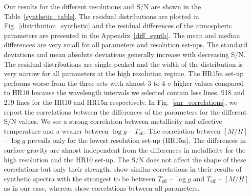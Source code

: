\documentclass[fleqn,usenatbib]{mnras}
\begin{document}
Our results for the different resolutions and S/N are shown in the Table~\ref{synthetic_table}. The residual distributions are plotted in Fig.~\ref{distribution_synthetic} and 
the residual differences of the atmospheric parameters are presented in the Appendix~\ref{diff_synth}. 
The mean and median differences are very small for all parameters and resolution set-ups. The standard deviations and mean absolute deviations generally increase with decreasing S/N. 
The residual distributions are single peaked and the width of the distribution is very narrow for all parameters at the high resolution regime. 
The HR15n set-up performs worse from the three sets with almost 3 to 4 $\sigma$ higher values compared to HR10 because the wavelength intervals we selected contain less lines, 918 and 219 
lines for the HR10 and HR15n respectively. In Fig.~\ref{snr_correlations}, we report the correlations between the differences of the parameters for the different S/N values. 
We see a strong correlation between metallicity and effective temperature and a weaker between $\log g$ -- $T_{\mathrm{eff}}$. The correlation between $[M/H]$ -- $\log g$ prevails only 
for the lowest resolution set-up (HR15n). The differences in surface gravity are almost independent from the differences in metallicity for the high resolution and the HR10 set-up. 
The S/N does not affect the shape of these correlations but only their strength. 
\cite{Kordopatis2011} show similar correlations in their results of synthetic spectra with the strongest to be between $T_{\mathrm{eff}}$ -- $\log g$ and 
$T_{\mathrm{eff}}$ -- $[M/H]$ as in our case, whereas \cite{recio2016} show correlations between all parameters.
\end{document}
